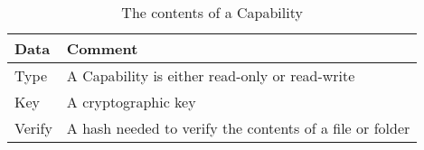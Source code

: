 \begin{table}
  \centering
  \caption{The contents of a Capability}
  \begin{tabular}{ | l | l |}
    \hline
    \textbf{Data}       & \textbf{Comment}                          \\ \hline
     Type               & A Capability is either read-only or read-write    \\ \hline
     Key                & A cryptographic key   \\ \hline
     Verify             & A hash needed to verify the contents of a file or folder  \\ \hline
  \end{tabular}
  \label{tbl:capability}
\end{table}
